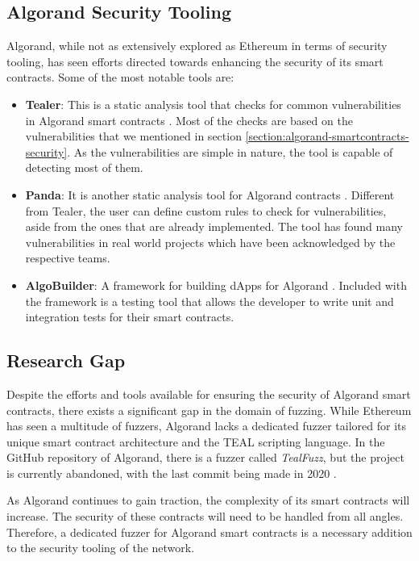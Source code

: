 \subsection*{Algorand Security Tooling}
Algorand, while not as extensively explored as Ethereum in terms of security tooling, has seen efforts directed towards enhancing the security of its smart contracts. Some of the most notable tools are:
\begin{itemize}
    \item \textbf{Tealer}: This is a static analysis tool that checks for common vulnerabilities in Algorand smart contracts \cite{noauthor_crytictealer_nodate}.
          Most of the checks are based on the vulnerabilities that we mentioned in section \ref{section:algorand-smartcontracts-security}.
          As the vulnerabilities are simple in nature, the tool is capable of detecting most of them.

    \item \textbf{Panda}: It is another static analysis tool for Algorand contracts \cite{sun_panda_2023}.
          Different from Tealer, the user can define custom rules to check for vulnerabilities, aside from the ones that are already implemented.
          The tool has found many vulnerabilities in real world projects which have been acknowledged by the respective teams.
    \item \textbf{AlgoBuilder}: A framework for building \acp{dApp} for Algorand \cite{noauthor_algo_nodate}.
          Included with the framework is a testing tool that allows the developer to write unit and integration tests for their smart contracts.
\end{itemize}

\subsection*{Research Gap}
Despite the efforts and tools available for ensuring the security of Algorand smart contracts, there exists a significant gap in the domain of fuzzing.
While Ethereum has seen a multitude of fuzzers, Algorand lacks a dedicated fuzzer tailored for its unique smart contract architecture and the \ac{TEAL} scripting language.
In the GitHub repository of Algorand, there is a fuzzer called \textit{TealFuzz}, but the project is currently abandoned, with the last commit being made in 2020 \cite{noauthor_tealfuzz_2023}.

As Algorand continues to gain traction, the complexity of its smart contracts will increase.
The security of these contracts will need to be handled from all angles.
Therefore, a dedicated fuzzer for Algorand smart contracts is a necessary addition to the security tooling of the network.